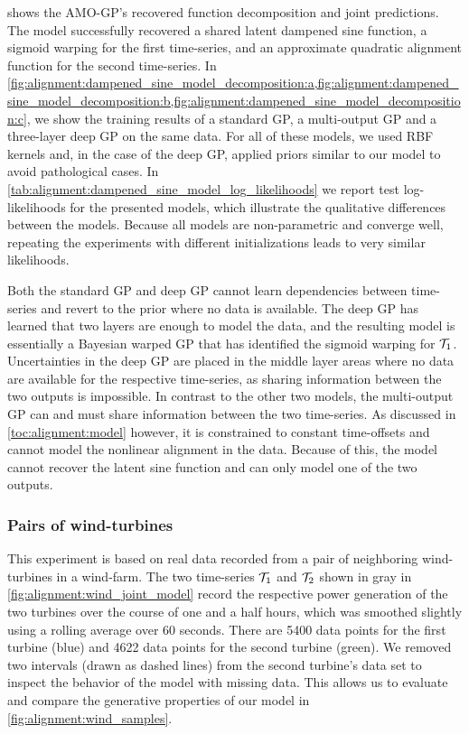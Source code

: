  shows the AMO-GP's recovered function decomposition and joint predictions.
The model successfully recovered a shared latent dampened sine function, a sigmoid warping for the first time-series, and an approximate quadratic alignment function for the second time-series.
In \cref{fig:alignment:dampened_sine_model_decomposition:a,fig:alignment:dampened_sine_model_decomposition:b,fig:alignment:dampened_sine_model_decomposition:c}, we show the training results of a standard GP, a multi-output GP and a three-layer deep GP on the same data.
For all of these models, we used RBF kernels and, in the case of the deep GP, applied priors similar to our model to avoid pathological cases.
In \cref{tab:alignment:dampened_sine_model_log_likelihoods} we report test log-likelihoods for the presented models, which illustrate the qualitative differences between the models.
Because all models are non-parametric and converge well, repeating the experiments with different initializations leads to very similar likelihoods.

Both the standard GP and deep GP cannot learn dependencies between time-series and revert to the prior where no data is available.
The deep GP has learned that two layers are enough to model the data, and the resulting model is essentially a Bayesian warped GP that has identified the sigmoid warping for $\mathcal{T}_1$.
Uncertainties in the deep GP are placed in the middle layer areas where no data are available for the respective time-series, as sharing information between the two outputs is impossible.
In contrast to the other two models, the multi-output GP can and must share information between the two time-series.
As discussed in \cref{toc:alignment:model} however, it is constrained to constant time-offsets and cannot model the nonlinear alignment in the data.
Because of this, the model cannot recover the latent sine function and can only model one of the two outputs.


\subsubsection{Pairs of wind-turbines}
This experiment is based on real data recorded from a pair of neighboring wind-turbines in a wind-farm.
The two time-series $\mathcal{T}_1$ and $\mathcal{T}_2$ shown in gray in \cref{fig:alignment:wind_joint_model} record the respective power generation of the two turbines over the course of one and a half hours, which was smoothed slightly using a rolling average over 60 seconds.
There are 5400 data points for the first turbine (blue) and 4622 data points for the second turbine (green).
We removed two intervals (drawn as dashed lines) from the second turbine's data set to inspect the behavior of the model with missing data.
This allows us to evaluate and compare the generative properties of our model in \cref{fig:alignment:wind_samples}.

